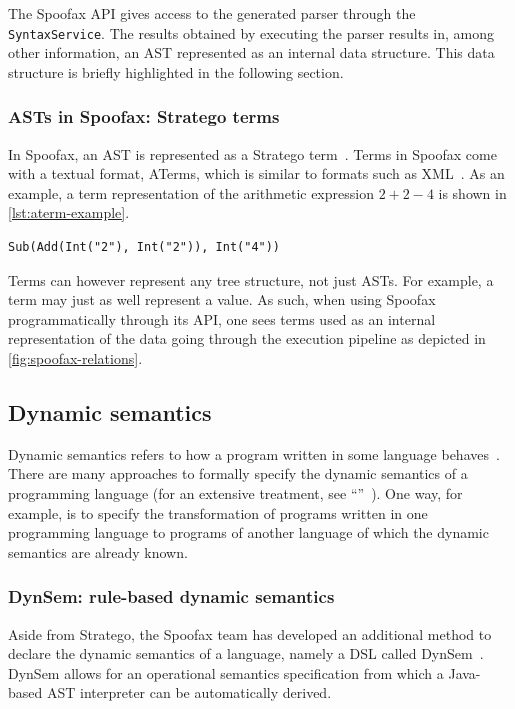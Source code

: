 The Spoofax API gives access to the generated parser through the
\texttt{SyntaxService}. The results obtained by executing the parser results in,
among other information, an AST represented as an internal data structure. This
data structure is briefly highlighted in the following section.

\subsubsection{ASTs in Spoofax: Stratego terms}
\label{sec:asts-spoof-strat}
In Spoofax, an AST is represented as a Stratego term~\cite{Kats10a}. Terms in
Spoofax come with a textual format, ATerms, which is similar to formats such as
XML~\cite{Brand00}. As an example, a term representation of the arithmetic
expression $2 + 2 - 4$ is shown in \cref{lst:aterm-example}.

\begin{lstlisting}[caption={An example ATerm representation of an arithmetic
expression.},language=aterm,label={lst:aterm-example}]
Sub(Add(Int("2"), Int("2")), Int("4"))
\end{lstlisting}

Terms can however represent any tree structure, not just ASTs. For example, a
term may just as well represent a value. As such, when using Spoofax
programmatically through its API, one sees terms used as an internal
representation of the data going through the execution pipeline as depicted in
\cref{fig:spoofax-relations}.

\subsection{Dynamic semantics}
\label{ssec:dynamic-semantics}
Dynamic semantics refers to how a program written in some language
behaves~\cite{Winskel93}. There are many approaches to formally specify the
dynamic semantics of a programming language (for an extensive treatment, see
``''~\cite{Winskel93}). One way, for example, is
to specify the transformation of programs written in one programming language to
programs of another language of which the dynamic semantics are already known.

\subsubsection{DynSem: rule-based dynamic semantics}
\label{ssec:dynsem}
Aside from Stratego, the Spoofax team has developed an additional method to
declare the dynamic semantics of a language, namely a DSL called
DynSem~\cite{VerguNV15}. DynSem allows for an operational semantics
specification from which a Java-based AST interpreter can be automatically
derived.

